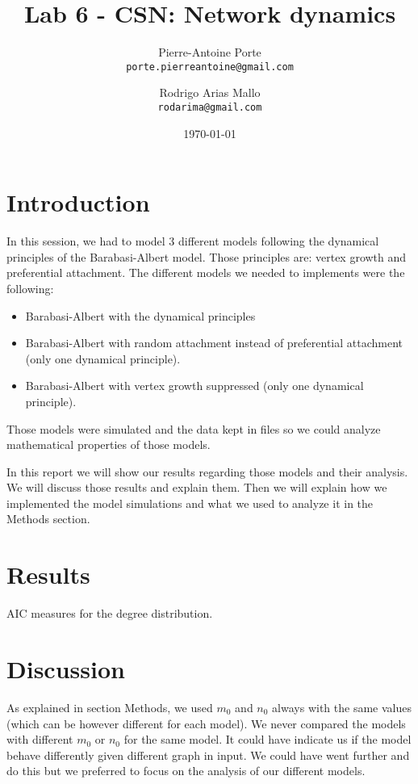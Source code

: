 \documentclass{article}
\title{Lab 6 - CSN: Network dynamics}
\author{Pierre-Antoine Porte \\ \texttt{porte.pierreantoine@gmail.com}
\and Rodrigo Arias Mallo \\ \texttt{rodarima@gmail.com}}
\date{\today}
\begin{document}
\maketitle

\section*{Introduction}

In this session, we had to model 3 different models following the dynamical 
principles of the Barabasi-Albert model. Those principles are: vertex growth and 
preferential attachment. The different models we needed to implements were the 
following:

\begin{itemize}
	\item Barabasi-Albert with the dynamical principles
	\item Barabasi-Albert with random attachment instead of preferential 
	attachment (only one dynamical principle).
	\item Barabasi-Albert with vertex growth suppressed (only one dynamical 
	principle).
\end{itemize}

Those models were simulated and the data kept in files so we could analyze 
mathematical properties of those models.

In this report we will show our results regarding those models and their 
analysis. We will discuss those results and explain them. Then we will explain 
how we implemented the model simulations and what we used to analyze it in the 
Methods section.

\section*{Results}
%
\begin{table}[h]
	\centering
	
	\caption{AIC measures for the degree distribution.}
	\label{tab:AICdd}
\end{table}
%

\section*{Discussion}

As explained in section Methods, we used $m_0$ and $n_0$ always with the same 
values (which can be however different for each model). We never compared the 
models with different $m_0$ or $n_0$ for the same model. It could have indicate 
us if the model behave differently given different graph in input. We could have 
went further and do this but we preferred to focus on the analysis of our 
different models.
\end{document}

